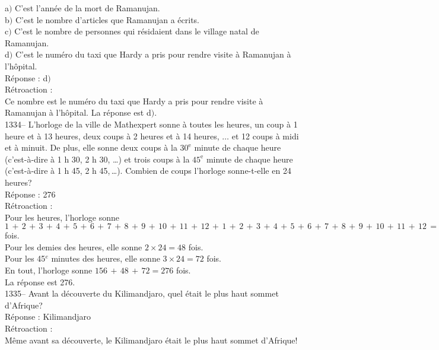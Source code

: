 ﻿\documentclass[letterpaper, 12pt]{article}
\begin{document}
a$)$ C'est l'ann\'ee de la mort de Ramanujan. \\
b$)$ C'est le nombre d'articles que Ramanujan a \'ecrits. \\
c$)$ C'est le nombre de personnes qui r\'esidaient dans le village natal de
Ramanujan. \\
d$)$ C'est le num\'ero du taxi que Hardy a pris pour rendre visite \`a
Ramanujan \`a l'h\^opital.\\

R\'eponse : d$)$\\

R\'etroaction : \\
Ce nombre est le num\'ero du taxi que Hardy a pris pour rendre
visite \`a Ramanujan \`a l'h\^opital.
La r\'eponse est  d$)$.\\


1334-- L'horloge de la ville de Mathexpert sonne \`a toutes les heures, un
coup \`a 1 heure et \`a 13 heures, deux  coups \`a 2 heures et \`a 14
heures, $\ldots$ et 12 coups \`a midi et \`a minuit.  De plus, elle sonne
deux coups \`a la $30^{\textrm{e}}$ minute de chaque heure (c'est-\`a-dire
\`a 1 h 30, 2 h 30, \ldots) et trois coups \`a la $45^{\textrm{e}}$ minute
de chaque heure (c'est-\`a-dire \`a 1 h 45, 2 h 45,\,\ldots).  Combien de
coups l'horloge sonne-t-elle en 24 heures?\\

R\'eponse : 276\\

R\'etroaction :\\
Pour les heures, l'horloge sonne
$1\,+\,2\,+\,3\,+\,4\,+\,5\,+\,6\,+\,7\,+\,8\,+\,9\,+\,10\,+\,11\,+\,12\,+\,1\,+\,2\,+\,3\,+\,4\,+\,5\,+\,6\,+\,7\,+\,8\,+\,9\,+\,10\,+\,11\,+\,12\,=\,156$
fois.\\
Pour les demies des heures, elle sonne $2\times24=48$ fois.\\
Pour les 45$^e$ minutes des heures, elle sonne $3\times24=72$ fois.\\
En tout, l'horloge sonne $156\,+\,48\,+\,72=276$ fois.\\
La r\'eponse est 276.\\



1335-- Avant la d\'ecouverte du Kilimandjaro, quel \'etait le plus haut
sommet d'Afrique?\\

R\'eponse : Kilimandjaro\\

R\'etroaction : \\
M\^eme avant sa d\'ecouverte, le Kilimandjaro \'etait le plus haut sommet
d'Afrique!\\
\end{document}
